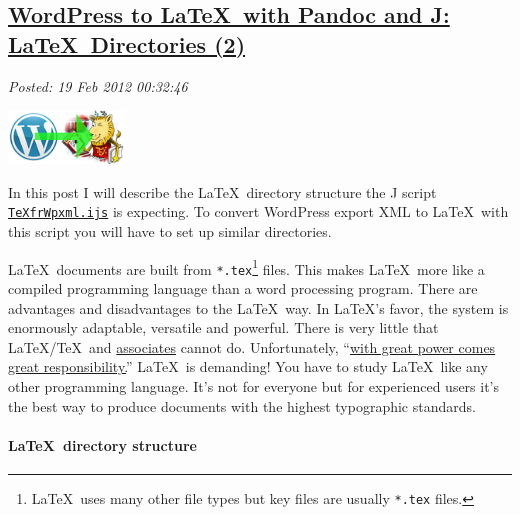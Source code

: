 %

\subsection*{\href{https://bakerjd99.wordpress.com/2012/02/18/wordpress-to-latex-with-pandoc-and-j-latex-directories-part-2-2/}{WordPress to \LaTeX\ with Pandoc and J: \LaTeX\ Directories (2)}}


\noindent\emph{Posted: 19 Feb 2012 00:32:46}
\vspace{6pt}

\captionsetup[floatingfigure]{labelformat=empty}
\begin{floatingfigure}[r]{0.25\textwidth}
\centering
\includegraphics[width=0.23\textwidth]{i-mNK4RHL-M.png}
\caption{WordPress to \LaTeX}
\label{fig:2374X0}
\end{floatingfigure}In this post I will describe the \LaTeX\ directory structure the J script
\href{https://github.com/bakerjd99/jacks/blob/master/texfrwpxml/TeXfrWpxml.ijs}{\texttt{TeXfrWpxml.ijs}}
is expecting. To convert WordPress export XML to \LaTeX\ with this script
you will have to set up similar directories.

\LaTeX\ documents are built from \texttt{*.tex}\footnote{
\LaTeX\ uses many other file types but key files
are usually \texttt{*.tex} files.
} files.
This makes \LaTeX\ more like a compiled programming language than a word
processing program. There are advantages and disadvantages to the \LaTeX\
way. In \LaTeX's favor, the system is enormously adaptable, versatile and
powerful. There is very little that \LaTeX/\TeX\ and
\href{http://www.amazon.com/LaTeX-Companions-Third-Revised-Boxed/dp/0321514432}{associates}
cannot do. Unfortunately,
``\href{http://www.youtube.com/watch?v=IKmQW7JTb6s}{with great power
comes great responsibility.}'' \LaTeX\ is demanding! You have to study
\LaTeX\ like any other programming language. It's not for everyone but for
experienced users it's the best way to produce documents with the
highest typographic standards.

\paragraph{\LaTeX\ directory structure}

